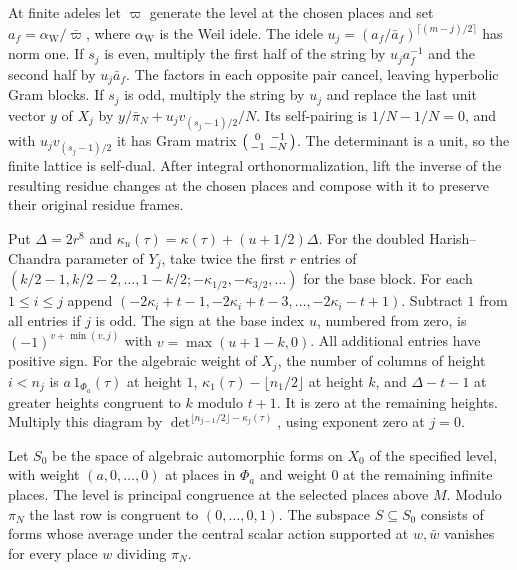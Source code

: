 At finite adeles let \(\varpi\) generate the level at the chosen places and
set \(a_f=\alpha_\mathrm{W}/\bar\varpi\), where \(\alpha_\mathrm{W}\) is the Weil idele.
The idele \(u_j=(a_f/\bar a_f)^{\lceil(m-j)/2\rceil}\) has norm one.
If \(s_j\) is even, multiply the first half of the string by \(u_ja_f^{-1}\)
and the second half by \(u_j\bar a_f\). The factors in each opposite
pair cancel, leaving hyperbolic Gram blocks. If \(s_j\) is odd,
multiply the string by \(u_j\) and replace the last unit vector \(y\)
of \(X_j\) by \(y/\bar\pi_N+u_jv_{(s_j-1)/2}/N\).
Its self-pairing is \(1/N-1/N=0\), and with \(u_jv_{(s_j-1)/2}\) it has
Gram matrix \(\begin{psmallmatrix}0&-1\\-1&-N\end{psmallmatrix}\).
The determinant is a unit, so the finite lattice is self-dual.
After integral orthonormalization, lift the inverse of the resulting
residue changes at the chosen places and compose with it to preserve
their original residue frames.

Put \(\Delta=2r^8\) and \(\kappa_u(\tau)=\kappa(\tau)+(u+1/2)\Delta\).
For the doubled Harish--Chandra parameter of \(Y_j\), take twice the first
\(r\) entries of \((k/2-1,k/2-2,\ldots,1-k/2;
-\kappa_{1/2},-\kappa_{3/2},\ldots)\) for the base block.
For each \(1\le i\le j\) append
\((-2\kappa_i+t-1,-2\kappa_i+t-3,\ldots,-2\kappa_i-t+1)\).
Subtract \(1\) from all entries if \(j\) is odd.
The sign at the base index \(u\), numbered from zero, is
\((-1)^{v+\min(v,j)}\) with \(v=\max(u+1-k,0)\).
All additional entries have positive sign.
For the algebraic weight of \(X_j\), the number of columns of
height \(i<n_j\) is \(a\,1_{\Phi_a}(\tau)\) at height \(1\),
\(\kappa_1(\tau)-\lfloor n_1/2\rfloor\) at height \(k\),
and \(\Delta-t-1\) at greater heights congruent to \(k\) modulo \(t+1\).
It is zero at the remaining heights. Multiply this diagram by
\(\det^{\lfloor n_{j-1}/2\rfloor-\kappa_j(\tau)}\), using exponent
zero at \(j=0\).

Let \(S_0\) be the space of algebraic automorphic forms on \(X_0\) of the
specified level, with weight \((a,0,\ldots,0)\) at places in \(\Phi_a\)
and weight \(0\) at the remaining infinite places.
The level is principal congruence at the selected places above \(M\).
Modulo \(\pi_N\) the last row is congruent to \((0,\ldots,0,1)\).
The subspace \(S\subseteq S_0\) consists of forms whose average under the
central scalar action supported at \(w,\bar w\) vanishes for every
place \(w\) dividing \(\pi_N\).

